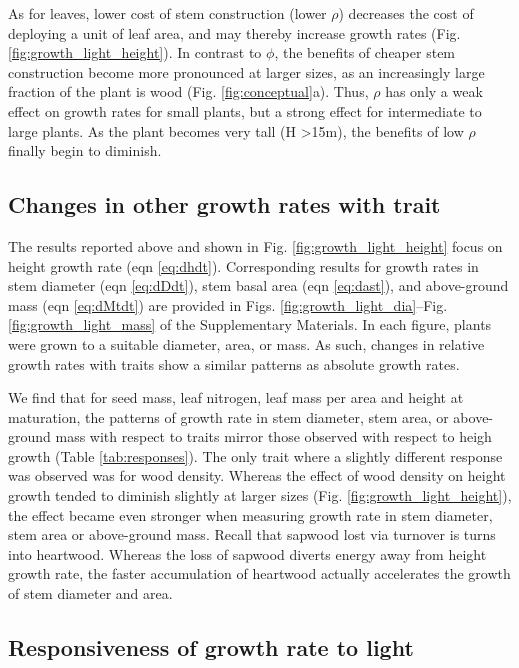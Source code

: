 \documentclass[a4paper,11pt]{article}
\begin{document}
As for leaves, lower cost of stem construction (lower $\rho$) decreases the cost of deploying a unit of leaf area, and may thereby increase growth rates (Fig. \ref{fig:growth_light_height}). In contrast to $\phi$, the benefits of cheaper stem construction become more pronounced at larger sizes, as an increasingly large fraction of the plant is wood (Fig. \ref{fig:conceptual}a). Thus, $\rho$ has only a weak effect on growth rates for small plants, but a strong effect for intermediate to large plants. As the plant becomes very tall (H \textgreater 15m), the benefits of low $\rho$ finally begin to diminish.

\subsection{Changes in other growth rates with trait}

The results reported above and shown in Fig. \ref{fig:growth_light_height} focus on height growth rate (eqn \ref{eq:dhdt}). Corresponding results for growth rates in stem diameter (eqn \ref{eq:dDdt}), stem basal area (eqn \ref{eq:dast}), and above-ground mass (eqn \ref{eq:dMtdt}) are provided in Figs. \ref{fig:growth_light_dia}--Fig. \ref{fig:growth_light_mass} of the Supplementary Materials. In each figure, plants were grown to a suitable diameter, area, or mass. As such, changes in relative growth rates with traits show a similar patterns as absolute growth rates.

We find that for seed mass, leaf nitrogen, leaf mass per area and height at maturation, the patterns of growth rate in stem diameter, stem area, or above-ground mass with respect to traits mirror those observed with respect to heigh growth (Table \ref{tab:responses}). The only trait where a slightly different response was observed was for wood density. Whereas the effect of wood density on height growth tended to diminish slightly at larger sizes (Fig. \ref{fig:growth_light_height}), the effect became even stronger when measuring growth rate in stem diameter, stem area or above-ground mass. Recall that sapwood lost via turnover is turns into heartwood. Whereas the loss of sapwood diverts energy away from height growth rate, the faster accumulation of heartwood actually accelerates the growth of stem diameter and area.

\subsection{Responsiveness of growth rate to light}
\end{document}
